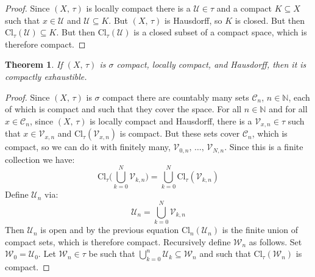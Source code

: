 \documentclass{article}
\theoremstyle{plain}
\newtheorem{theorem}{Theorem}[section]
\theoremstyle{normal}
\begin{document}
        \begin{proof}
            Since $(X,\,\tau)$ is locally compact there is a
            $\mathcal{U}\in\tau$ and a compact $K\subseteq{X}$ such that
            $x\in\mathcal{U}$ and $\mathcal{U}\subseteq{K}$. But $(X,\,\tau)$
            is Hausdorff, so $K$ is closed. But then
            $\textrm{Cl}_{\tau}(\mathcal{U})\subseteq{K}$. But then
            $\textrm{Cl}_{\tau}(\mathcal{U})$ is a closed subset of a compact
            space, which is therefore compact.
        \end{proof}
        \begin{theorem}
            If $(X,\,\tau)$ is $\sigma$ compact, locally compact, and Hausdorff,
            then it is compactly exhaustible.
        \end{theorem}
        \begin{proof}
            Since $(X,\,\tau)$ is $\sigma$ compact there are countably many
            sets $\mathcal{C}_{n}$, $n\in\mathbb{N}$, each of which is compact
            and such that they cover the space. For all $n\in\mathbb{N}$ and
            for all $x\in\mathcal{C}_{n}$, since $(X,\,\tau)$ is locally compact
            and Hausdorff, there is a $\mathcal{V}_{x,n}\in\tau$ such that
            $x\in\mathcal{V}_{x,n}$ and $\textrm{Cl}_{\tau}(\mathcal{V}_{x,n})$
            is compact. But these sets cover $\mathcal{C}_{n}$, which is
            compact, so we can do it with finitely many,
            $\mathcal{V}_{0,n},\,\dots,\,\mathcal{V}_{N,n}$. Since this is
            a finite collection we have:
            \begin{equation}
                \textrm{Cl}_{\tau}\Big(\bigcup_{k=0}^{N}\mathcal{V}_{k,n}\Big)
                =\bigcup_{k=0}^{N}\textrm{Cl}_{\tau}(\mathcal{V}_{k,n})
            \end{equation}
            Define $\mathcal{U}_{n}$ via:
            \begin{equation}
                \mathcal{U}_{n}=\bigcup_{k=0}^{N}\mathcal{V}_{k,n}
            \end{equation}
            Then $\mathcal{U}_{n}$ is open and by the previous equation
            $\textrm{Cl}_{n}(\mathcal{U}_{n})$ is the finite union of compact
            sets, which is therefore compact. Recursively define
            $\mathcal{W}_{n}$ as follows. Set $\mathcal{W}_{0}=\mathcal{U}_{0}$.
            Let $\mathcal{W}_{n}\in\tau$ be such that
            $\bigcup_{k=0}^{n}\mathcal{U}_{k}\subseteq\mathcal{W}_{n}$ and
            such that $\textrm{Cl}_{\tau}(\mathcal{W}_{n})$ is compact.

\end{proof}
\end{document}
